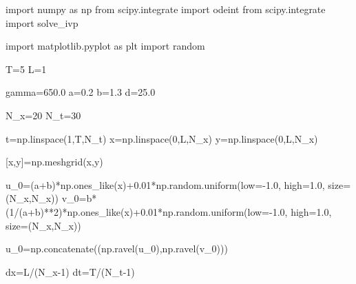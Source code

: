 \documentclass[
  letterpaper,
  DIV=11,
  numbers=noendperiod]{scrreprt}
\newenvironment{Shaded}{\begin{snugshade}}{\end{snugshade}}
\newcommand{\DecValTok}[1]{\textcolor[rgb]{0.68,0.00,0.00}{#1}}
\newcommand{\FloatTok}[1]{\textcolor[rgb]{0.68,0.00,0.00}{#1}}
\newcommand{\ImportTok}[1]{\textcolor[rgb]{0.00,0.46,0.62}{#1}}
\newcommand{\NormalTok}[1]{\textcolor[rgb]{0.00,0.23,0.31}{#1}}
\newcommand{\OperatorTok}[1]{\textcolor[rgb]{0.37,0.37,0.37}{#1}}
\theoremstyle{plain}
\theoremstyle{definition}
\theoremstyle{plain}
\theoremstyle{remark}
\begin{document}
\begin{Shaded}
\begin{Highlighting}[]
\ImportTok{import}\NormalTok{ numpy }\ImportTok{as}\NormalTok{ np}
\ImportTok{from}\NormalTok{ scipy.integrate }\ImportTok{import}\NormalTok{ odeint}
\ImportTok{from}\NormalTok{ scipy.integrate }\ImportTok{import}\NormalTok{ solve\_ivp}

\ImportTok{import}\NormalTok{ matplotlib.pyplot }\ImportTok{as}\NormalTok{ plt}
\ImportTok{import}\NormalTok{ random}

\NormalTok{T}\OperatorTok{=}\DecValTok{5}
\NormalTok{L}\OperatorTok{=}\DecValTok{1}

\NormalTok{gamma}\OperatorTok{=}\FloatTok{650.0}
\NormalTok{a}\OperatorTok{=}\FloatTok{0.2}
\NormalTok{b}\OperatorTok{=}\FloatTok{1.3}
\NormalTok{d}\OperatorTok{=}\FloatTok{25.0}

\NormalTok{N\_x}\OperatorTok{=}\DecValTok{20}
\NormalTok{N\_t}\OperatorTok{=}\DecValTok{30}

\NormalTok{t}\OperatorTok{=}\NormalTok{np.linspace(}\DecValTok{1}\NormalTok{,T,N\_t)}
\NormalTok{x}\OperatorTok{=}\NormalTok{np.linspace(}\DecValTok{0}\NormalTok{,L,N\_x)}
\NormalTok{y}\OperatorTok{=}\NormalTok{np.linspace(}\DecValTok{0}\NormalTok{,L,N\_x)}

\NormalTok{[x,y]}\OperatorTok{=}\NormalTok{np.meshgrid(x,y)}

\NormalTok{u\_0}\OperatorTok{=}\NormalTok{(a}\OperatorTok{+}\NormalTok{b)}\OperatorTok{*}\NormalTok{np.ones\_like(x)}\OperatorTok{+}\FloatTok{0.01}\OperatorTok{*}\NormalTok{np.random.uniform(low}\OperatorTok{={-}}\FloatTok{1.0}\NormalTok{, high}\OperatorTok{=}\FloatTok{1.0}\NormalTok{, size}\OperatorTok{=}\NormalTok{(N\_x,N\_x))}
\NormalTok{v\_0}\OperatorTok{=}\NormalTok{b}\OperatorTok{*}\NormalTok{(}\DecValTok{1}\OperatorTok{/}\NormalTok{(a}\OperatorTok{+}\NormalTok{b)}\OperatorTok{**}\DecValTok{2}\NormalTok{)}\OperatorTok{*}\NormalTok{np.ones\_like(x)}\OperatorTok{+}\FloatTok{0.01}\OperatorTok{*}\NormalTok{np.random.uniform(low}\OperatorTok{={-}}\FloatTok{1.0}\NormalTok{, high}\OperatorTok{=}\FloatTok{1.0}\NormalTok{, size}\OperatorTok{=}\NormalTok{(N\_x,N\_x))}

\NormalTok{u\_0}\OperatorTok{=}\NormalTok{np.concatenate((np.ravel(u\_0),np.ravel(v\_0)))}

\NormalTok{dx}\OperatorTok{=}\NormalTok{L}\OperatorTok{/}\NormalTok{(N\_x}\OperatorTok{{-}}\DecValTok{1}\NormalTok{)}
\NormalTok{dt}\OperatorTok{=}\NormalTok{T}\OperatorTok{/}\NormalTok{(N\_t}\OperatorTok{{-}}\DecValTok{1}\NormalTok{)}




\end{Highlighting}
\end{Shaded}
\end{document}
